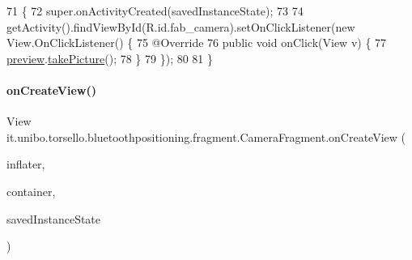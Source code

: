 \begin{DoxyCode}
71                                                                        \{
72         super.onActivityCreated(savedInstanceState);
73 
74         getActivity().findViewById(R.id.fab\_camera).setOnClickListener(\textcolor{keyword}{new} View.OnClickListener() \{
75             @Override
76             \textcolor{keyword}{public} \textcolor{keywordtype}{void} onClick(View v) \{
77                 \hyperlink{classit_1_1unibo_1_1torsello_1_1bluetoothpositioning_1_1fragment_1_1CameraFragment_af14f8f1e4107c9a9063cf70d1fbb5bb5_af14f8f1e4107c9a9063cf70d1fbb5bb5}{preview}.\hyperlink{classit_1_1unibo_1_1torsello_1_1bluetoothpositioning_1_1util_1_1CameraPreviewUtil_a4f4ca8b7292c4e410f1f5aca3a53423a_a4f4ca8b7292c4e410f1f5aca3a53423a}{takePicture}();
78             \}
79         \});
80 
81     \}
\end{DoxyCode}
\hypertarget{classit_1_1unibo_1_1torsello_1_1bluetoothpositioning_1_1fragment_1_1CameraFragment_a3a80f360922bd6a8c749cda2a09c64cf_a3a80f360922bd6a8c749cda2a09c64cf}{}\label{classit_1_1unibo_1_1torsello_1_1bluetoothpositioning_1_1fragment_1_1CameraFragment_a3a80f360922bd6a8c749cda2a09c64cf_a3a80f360922bd6a8c749cda2a09c64cf} 
\paragraph{\texorpdfstring{on\+Create\+View()}{onCreateView()}}
{\footnotesize\ttfamily View it.\+unibo.\+torsello.\+bluetoothpositioning.\+fragment.\+Camera\+Fragment.\+on\+Create\+View (\begin{DoxyParamCaption}\item[{Layout\+Inflater}]{inflater,  }\item[{View\+Group}]{container,  }\item[{Bundle}]{saved\+Instance\+State }\end{DoxyParamCaption})}


